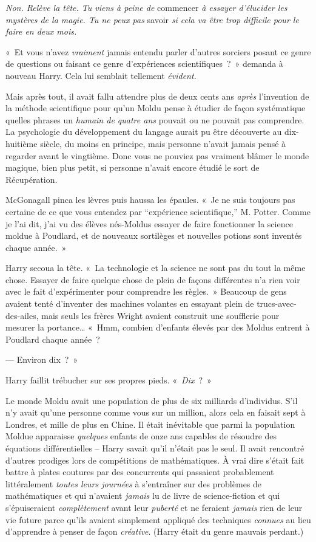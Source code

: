 \emph{Non. Relève la tête. Tu viens à peine de} commencer \emph{à essayer d'élucider les mystères de la magie. Tu ne peux pas} savoir \emph{si cela va être trop difficile pour le faire en deux mois.}

«~Et vous n'avez \emph{vraiment} jamais entendu parler d'autres sorciers posant ce genre de questions ou faisant ce genre d'expériences scientifiques~?~» demanda à nouveau Harry.
Cela lui semblait tellement \emph{évident}.

Mais après tout, il avait fallu attendre plus de deux cents ans \emph{après} l'invention de la méthode scientifique pour qu'un Moldu pense à étudier de façon systématique quelles phrases un \emph{humain de quatre ans} pouvait ou ne pouvait pas comprendre.
La psychologie du développement du langage aurait pu être découverte au dix-huitième siècle, du moins en principe, mais personne n'avait jamais pensé à regarder avant le vingtième. Donc vous ne pouviez pas vraiment blâmer le monde magique, bien plus petit, si personne n'avait encore étudié le sort de Récupération.

McGonagall pinca les lèvres puis haussa les épaules.
«~Je ne suis toujours pas certaine de ce que vous entendez par “expérience scientifique,” M. Potter.
Comme je l'ai dit, j'ai vu des élèves nés-Moldus essayer de faire fonctionner la science moldue à Poudlard, et de nouveaux sortilèges et nouvelles potions sont inventés chaque année.~»

Harry secoua la tête.
«~La technologie et la science ne sont pas du tout la même chose.
Essayer de faire quelque chose de plein de façons différentes n'a rien voir avec le fait d'expérimenter pour comprendre les règles.~»
Beaucoup de gens avaient tenté d'inventer des machines volantes en essayant plein de trucs-avec-des-ailes, mais seuls les frères Wright avaient construit une soufflerie pour mesurer la portance…
«~Hmm, combien d'enfants élevés par des Moldus entrent à Poudlard chaque année~?

--- Environ dix~?~»

Harry faillit trébucher sur ses propres pieds. «~\emph{Dix}~?~»

Le monde Moldu avait une population de plus de six milliards d'individus.
S'il n'y avait qu'une personne comme vous sur un million, alors cela en faisait sept à Londres, et mille de plus en Chine.
Il était inévitable que parmi la population Moldue apparaisse \emph{quelques} enfants de onze ans capables de résoudre des équations différentielles --
Harry savait qu'il n'était pas le seul.  Il avait rencontré d'autres prodiges lors de compétitions de mathématiques.
À vrai dire s'était fait battre à plates coutures par des concurrents qui passaient probablement littéralement \emph{toutes leurs journées} à s'entraîner sur des problèmes de mathématiques et qui n'avaient \emph{jamais} lu de livre de science-fiction et qui s'épuiseraient \emph{complètement} avant leur \emph{puberté} et ne feraient \emph{jamais} rien de leur vie future parce qu'ils avaient simplement appliqué des techniques \emph{connues} au lieu d'apprendre à penser de façon \emph{créative}. (Harry était du genre mauvais perdant.)


